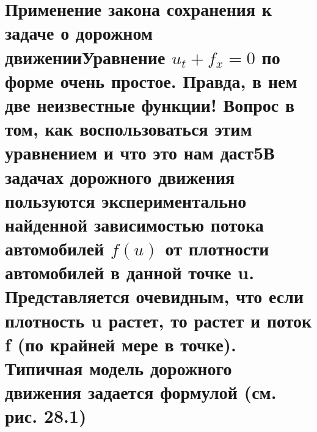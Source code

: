 \documentclass[
  ukrainian,
]{article}
\begin{document}
\section{\texorpdfstring{Применение закона сохранения к задаче о
дорожном движенииУравнение \(u_t + f_x = 0\) по форме очень простое.
Правда, в нем две неизвестные функции! Вопрос в том, как воспользоваться
этим уравнением и что это нам даст5В задачах дорожного движения
пользуются экспериментально найденной зависимостью потока автомобилей
\(f(u)\) от плотности автомобилей в данной точке u. Представляется
очевидным, что если плотность u растет, то растет и поток f (по крайней
мере в точке). Типичная модель дорожного движения задается формулой (см.
рис.
28.1)}{Применение закона сохранения к задаче о дорожном движенииУравнение u\_t + f\_x = 0 по форме очень простое. Правда, в нем две неизвестные функции! Вопрос в том, как воспользоваться этим уравнением и что это нам даст5В задачах дорожного движения пользуются экспериментально найденной зависимостью потока автомобилей f(u) от плотности автомобилей в данной точке u. Представляется очевидным, что если плотность u растет, то растет и поток f (по крайней мере в точке). Типичная модель дорожного движения задается формулой (см. рис. }}
\end{document}
